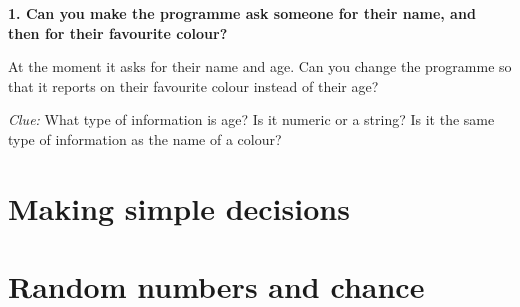   {\bf 1. Can you make the programme ask someone for their name, and
    then for their favourite colour?}

  At the moment it asks for their name and age. Can you change the
  programme so that it reports on their favourite colour instead of
  their age?

  {\em Clue:} What type of information is age? Is it numeric or a
  string? Is it the same type of information as the name of a colour?



\section{Making simple decisions}

\section{Random numbers and chance}
